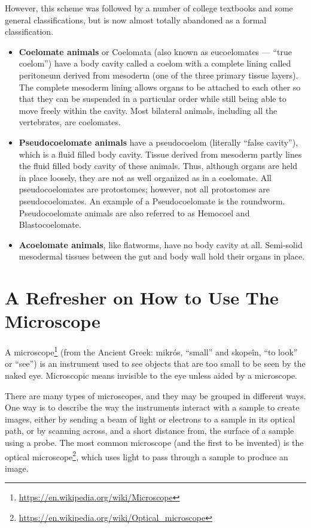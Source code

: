 \documentclass[]{book}
\let\rmarkdownfootnote\footnote%
\def\footnote{\protect\rmarkdownfootnote}
\renewcommand{\href}[2]{#2\footnote{\url{#1}}}
\theoremstyle{definition}
\theoremstyle{definition}
\theoremstyle{definition}
\theoremstyle{remark}
\begin{document}
\begin{enumerate}
However, this scheme was followed by a number of college textbooks and
some general classifications, but is now almost totally abandoned as a
formal classification.

\begin{itemize}
\item
  \textbf{Coelomate animals} or Coelomata (also known as eucoelomates
  --- ``true coelom'') have a body cavity called a coelom with a
  complete lining called peritoneum derived from mesoderm (one of the
  three primary tissue layers). The complete mesoderm lining allows
  organs to be attached to each other so that they can be suspended in a
  particular order while still being able to move freely within the
  cavity. Most bilateral animals, including all the vertebrates, are
  coelomates.
\item
  \textbf{Pseudocoelomate animals} have a pseudocoelom (literally
  ``false cavity''), which is a fluid filled body cavity. Tissue derived
  from mesoderm partly lines the fluid filled body cavity of these
  animals. Thus, although organs are held in place loosely, they are not
  as well organized as in a coelomate. All pseudocoelomates are
  protostomes; however, not all protostomes are pseudocoelomates. An
  example of a Pseudocoelomate is the roundworm. Pseudocoelomate animals
  are also referred to as Hemocoel and Blastocoelomate.
\item
  \textbf{Acoelomate animals}, like flatworms, have no body cavity at
  all. Semi-solid mesodermal tissues between the gut and body wall hold
  their organs in place.
\end{itemize}

\chapter{A Refresher on How to Use The
Microscope}\label{a-refresher-on-how-to-use-the-microscope}

A \href{https://en.wikipedia.org/wiki/Microscope}{microscope} (from the
Ancient Greek: mikrós, ``small'' and skopeîn, ``to look'' or ``see'') is
an instrument used to see objects that are too small to be seen by the
naked eye. Microscopic means invisible to the eye unless aided by a
microscope.

There are many types of microscopes, and they may be grouped in
different ways. One way is to describe the way the instruments interact
with a sample to create images, either by sending a beam of light or
electrons to a sample in its optical path, or by scanning across, and a
short distance from, the surface of a sample using a probe. The most
common microscope (and the first to be invented) is the
\href{https://en.wikipedia.org/wiki/Optical_microscope}{optical
microscope}, which uses light to pass through a sample to produce an
image.


\end{enumerate}
\end{document}
